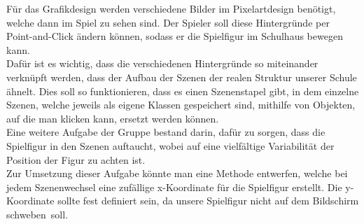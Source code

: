 Für das Grafikdesign werden verschiedene Bilder im Pixelartdesign benötigt, welche dann im Spiel zu sehen sind. Der Spieler soll diese Hintergründe per Point-and-Click ändern können, sodass er die Spielfigur im Schulhaus bewegen kann. \\ Dafür ist es wichtig, dass die verschiedenen Hintergründe so miteinander verknüpft werden, dass der Aufbau der Szenen der realen Struktur unserer Schule ähnelt. Dies soll so funktionieren, dass es einen Szenenstapel gibt, in dem einzelne Szenen, welche jeweils als eigene Klassen gespeichert sind, mithilfe von Objekten, auf die man klicken kann, ersetzt werden können. \\
Eine weitere Aufgabe der Gruppe bestand darin, dafür zu sorgen, dass die Spielfigur in den Szenen auftaucht, wobei auf eine vielfältige Variabilität der Position der Figur zu achten ist. \\ 
Zur Umsetzung dieser Aufgabe könnte man eine Methode entwerfen, welche bei jedem Szenenwechsel eine zufällige x-Koordinate für die Spielfigur erstellt. Die y-Koordinate sollte fest definiert sein, da unsere Spielfigur nicht auf dem Bildschirm \glqq schweben\grqq\ soll.
